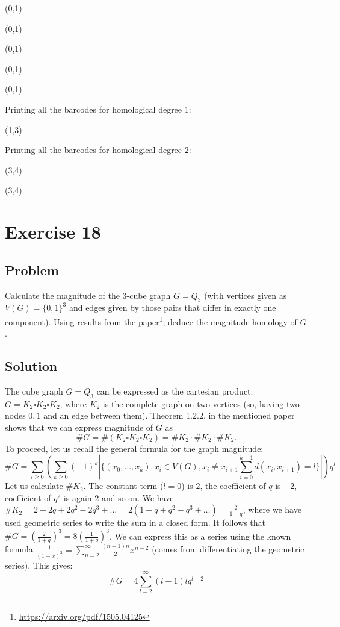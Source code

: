 \documentclass{article}
\begin{document}
\noindent
(0,1)

\noindent
(0,1)

\noindent
(0,1)

\noindent
(0,1)

\noindent
(0,1)

\noindent
Printing all the barcodes for homological degree 1:

\noindent
(1,3)

\noindent
Printing all the barcodes for homological degree 2:

\noindent
(3,4)

\noindent
(3,4)
\newpage
\section*{Exercise 18}
\subsection*{Problem}
Calculate the magnitude of the 3-cube graph $G=Q_3$ (with vertices given as $V(G) = \{0,1\}^3$ and edges given by those pairs that differ in exactly one component). Using results from the paper\footnote{\url{https://arxiv.org/pdf/1505.04125}}, deduce the magnitude homology of $G$.
\subsection*{Solution}
The cube graph $G=Q_3$ can be expressed as the cartesian product: $G=K_2 \square K_2 \square K_2$, where $K_2$ is the complete graph on two vertices (so, having two nodes $0,1$ and an edge between them).
Theorem 1.2.2. in the mentioned paper shows that we can express magnitude of $G$ as
\begin{equation*}
\#G = \#(K_2 \square K_2 \square K_2) = \#K_2 \cdot \#K_2 \cdot \#K_2.
\end{equation*}
To proceed, let us recall the general formula for the graph magnitude:
\begin{equation*}
\#G = \sum_{l \geq 0}\left(\sum_{k \geq 0}(-1)^k \left| \{(x_0,\dots,x_k) : x_i \in V(G), x_i \neq x_{i+1} \sum_{i=0}^{k-1} d(x_i,x_{i+1}) = l \} \right| \right) q^l
\end{equation*}
Let us calculate $\#K_2$. The constant term ($l=0$) is $2$, the coefficient of $q$ is $-2$, coefficient of $q^2$ is again $2$ and so on.
We have: $\#K_2 = 2-2q+2q^2-2q^3+\dots = 2(1-q+q^2-q^3+\dots) = \frac{2}{1+q}$, where we have used geometric series to write the sum in a closed form.
It follows that $\#G = (\frac{2}{1+q})^3 = 8(\frac{1}{1+q})^3$.
We can express this as a series using the known formula $\frac{1}{(1-x)^3} = \sum_{n=2}^\infty \frac{(n-1)n}{2} x^{n-2}$ (comes from differentiating the geometric series).
This gives:
\begin{equation*}
\#G = 4 \sum_{l=2}^\infty (l-1)l q^{l-2}
\end{equation*}
\end{document}
